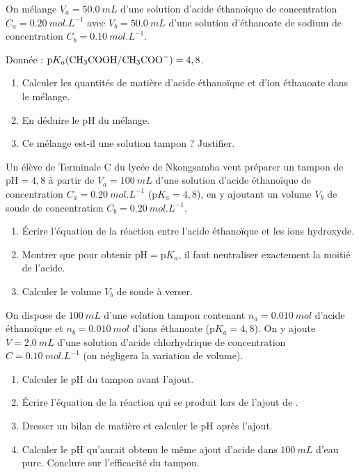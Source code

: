 \documentclass[11pt]{article}
\newcounter{popsec}
\newcounter{popsub}
\newcommand{\courssub}[1]{%
  \stepcounter{popsub}%
  \par\vspace{9pt}\noindent{\popxbold\fontsize{11.5}{13}\selectfont\color{popink}{\color{poporange}\thepopsec.\thepopsub}\hspace{6pt}#1}\par\nopagebreak\vspace{4pt}
}
\begin{document}
\courssub{Je m'entraîne}

\begin{exercice}
On mélange $V_a = \SI{50,0}{mL}$ d'une solution d'acide éthanoïque  de concentration $C_a = \SI{0,20}{mol.L^{-1}}$ avec $V_b = \SI{50,0}{mL}$ d'une solution d'éthanoate de sodium  de concentration $C_b = \SI{0,10}{mol.L^{-1}}$.
\par Donnée : $\mathrm{p}K_a(\ce{CH3COOH}/\ce{CH3COO-}) = 4,8$.
\begin{enumerate}
  \item Calculer les quantités de matière d'acide éthanoïque et d'ion éthanoate dans le mélange.
  \item En déduire le pH du mélange.
  \item Ce mélange est-il une solution tampon ? Justifier.
\end{enumerate}
\end{exercice}

\begin{exercice}
Un élève de Terminale C du lycée de Nkongsamba veut préparer un tampon de $\mathrm{pH} = 4,8$ à partir de $V_a = \SI{100}{mL}$ d'une solution d'acide éthanoïque de concentration $C_a = \SI{0,20}{mol.L^{-1}}$ ($\mathrm{p}K_a = 4,8$), en y ajoutant un volume $V_b$ de soude de concentration $C_b = \SI{0,20}{mol.L^{-1}}$.
\begin{enumerate}
  \item Écrire l'équation de la réaction entre l'acide éthanoïque et les ions hydroxyde.
  \item Montrer que pour obtenir $\mathrm{pH} = \mathrm{p}K_a$, il faut neutraliser exactement la moitié de l'acide.
  \item Calculer le volume $V_b$ de soude à verser.
\end{enumerate}
\end{exercice}

\begin{exercice}
On dispose de $\SI{100}{mL}$ d'une solution tampon contenant $n_a = \SI{0,010}{mol}$ d'acide éthanoïque et $n_b = \SI{0,010}{mol}$ d'ions éthanoate ($\mathrm{p}K_a = 4,8$). On y ajoute $V = \SI{2,0}{mL}$ d'une solution d'acide chlorhydrique de concentration $C = \SI{0,10}{mol.L^{-1}}$ (on négligera la variation de volume).
\begin{enumerate}
  \item Calculer le pH du tampon avant l'ajout.
  \item Écrire l'équation de la réaction qui se produit lors de l'ajout de .
  \item Dresser un bilan de matière et calculer le pH après l'ajout.
  \item Calculer le pH qu'aurait obtenu le même ajout d'acide dans $\SI{100}{mL}$ d'eau pure. Conclure sur l'efficacité du tampon.
\end{enumerate}
\end{exercice}
\end{document}
